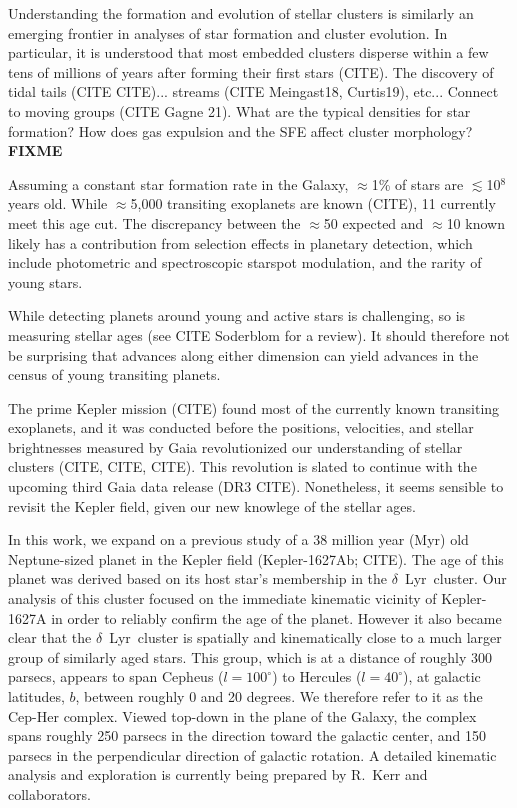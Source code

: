 \documentclass[12pt,twocolumn,linenumbers]{aastex63}
\begin{document}
Understanding the formation and evolution of stellar clusters is
similarly an emerging frontier in analyses of star formation and
cluster evolution.  In particular, it is understood that most embedded
clusters disperse within a few tens of millions of years after forming
their first stars (CITE).  The discovery of tidal tails (CITE CITE)...
streams (CITE Meingast18, Curtis19), etc...  Connect to moving groups
(CITE Gagne 21).  What are the typical densities for star formation?
How does gas expulsion and the SFE affect cluster morphology?  {\bf
FIXME}

Assuming a constant star formation rate in the Galaxy, $\approx$1\% of
stars are $\lesssim$10$^8$ years old.  While $\approx$5{,}000
transiting exoplanets are known (CITE), 11 currently meet this age
cut.  The discrepancy between the $\approx$50 expected and $\approx$10
known likely has a contribution from selection effects in planetary
detection, which include photometric and spectroscopic starspot
modulation, and the rarity of young stars.

While detecting planets around young and active stars is challenging,
so is measuring stellar ages (see CITE Soderblom for a review).  It
should therefore not be surprising that advances along either
dimension can yield advances in the census of young transiting
planets.

The prime Kepler mission (CITE) found most of the currently known
transiting exoplanets, and it was conducted before the positions,
velocities, and stellar brightnesses measured by Gaia revolutionized
our understanding of stellar clusters (CITE, CITE, CITE).  This
revolution is slated to continue with the upcoming third Gaia data
release (DR3 CITE).  Nonetheless, it seems sensible to revisit the
Kepler field, given our new knowlege of the stellar ages.

In this work, we expand on a previous study of a 38 million year (Myr)
old Neptune-sized planet in the Kepler field (Kepler-1627Ab; CITE).
The age of this planet was derived based on its host star's membership
in the $\delta$\ Lyr\ cluster.  Our analysis of this cluster focused
on the immediate kinematic vicinity of Kepler-1627A in order to
reliably confirm the age of the planet.  However it also became clear
that the $\delta$\ Lyr\ cluster is spatially and kinematically close
to a much larger group of similarly aged stars.  This group, which is
at a distance of roughly 300 parsecs, appears to span Cepheus
($l=100^\circ$) to Hercules ($l=40^\circ$), at galactic latitudes,
$b$, between roughly 0 and 20 degrees.  We therefore refer to it as
the Cep-Her complex.  Viewed top-down in the plane of the Galaxy, the
complex spans roughly 250 parsecs in the direction toward the galactic
center, and 150 parsecs in the perpendicular direction of galactic
rotation.  A detailed kinematic analysis and exploration is currently
being prepared by R.~Kerr and collaborators.
\end{document}
